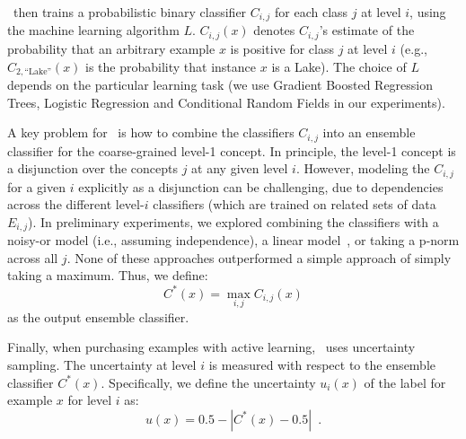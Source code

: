 \documentclass[10pt, conference, compsocconf]{IEEEtran}
\newcommand{\sys}{\Call{Hal}{}} %
\begin{document}
\sys\ then trains a probabilistic binary classifier $C_{i,j}$ for each class $j$ 
at level $i$, using the machine learning algorithm $L$.  $C_{i,j}(x)$ denotes
$C_{i,j}$'s estimate of the probability that an arbitrary example $x$ is positive for class $j$ at level $i$ (e.g.,
$C_{2,\mbox{``Lake''}}(x)$ is the probability that instance $x$ is a Lake).  
The choice of $L$ depends on the particular learning task
(we use Gradient Boosted Regression Trees, Logistic Regression and Conditional Random Fields  in our experiments).

A key problem for \sys\ is how to combine the 
classifiers $C_{i,j}$ into an ensemble classifier for the coarse-grained level-1
concept.  In principle,
the level-1 concept is a disjunction over the concepts $j$ at any given level $i$.
However, modeling the $C_{i,j}$ for a given $i$ explicitly as a disjunction can be
challenging, due to dependencies across the different level-$i$ classifiers (which
are trained on related sets of data $E_{i,j}$).  
In preliminary experiments, we explored
combining the classifiers with a noisy-or model (i.e., assuming independence), a linear model~\cite{Breiman1996},
or taking a p-norm across all $j$.  None of these approaches outperformed a simple approach of
simply taking a maximum.  Thus, we define:
\begin{equation}
\label{eq:maxcombine}
  C^*(x) = \max_{i,j} C_{i,j}(x)
\end{equation}
as the output ensemble classifier. 

Finally, when purchasing examples with active learning, \sys\ uses uncertainty sampling.
The uncertainty at level $i$
is measured with respect to the ensemble classifier $C^*(x)$.  Specifically,
we define the uncertainty $u_i(x)$ of the label for example $x$ for level $i$ as:
\begin{equation}
 u(x) = 0.5 - | C^*(x) -0.5|
\enspace .
\end{equation}
\end{document}

